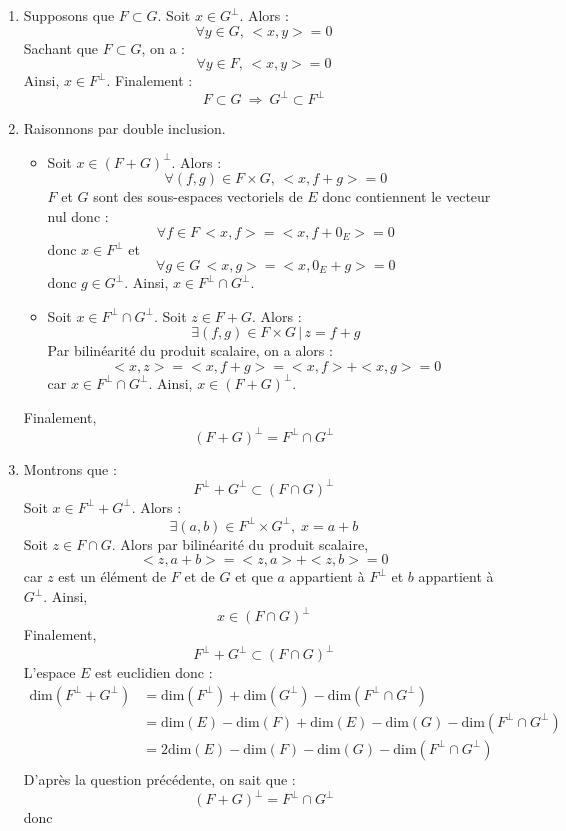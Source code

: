 \documentclass[a4paper,twoside,french,11pt]{VcCours}
\begin{document}
\begin{enumerate}
\item Supposons que $F\subset G$. Soit $x \in G^{\perp}$. Alors :
$$ \forall y \in G, \, <x,y>=0$$
Sachant que $F \subset G$, on a :
$$ \forall y \in F, \, <x,y>=0$$
Ainsi, $x \in F^{\perp}$. Finalement :
$$F\subset G \ \Longrightarrow \ G^{\perp}\subset F^{\perp}$$
\item Raisonnons par double inclusion.
\begin{itemize}
\item Soit $x \in (F+G)^{\perp}$. Alors :
$$ \forall (f,g) \in F \times G, \, <x,f+g>=0$$
$F$ et $G$ sont des sous-espaces vectoriels de $E$ donc contiennent le vecteur nul donc :
$$ \forall f \in F  \, <x,f>=<x,f+0_E>=0$$
donc $x \in F^{\perp}$ et 
$$ \forall g \in G  \, <x,g>=<x,0_E+g>=0$$
donc $g \in G^{\perp}$. Ainsi, $x \in F^{\perp}\cap G^{\perp}$.
\item Soit $x \in F^{\perp}\cap G^{\perp}$. Soit $z \in F+G$. Alors :
$$ \exists (f,g) \in F \times G \, \vert \, z=f+g$$
Par bilinéarité du produit scalaire, on a alors :
$$ <x,z>=<x,f+g> = <x,f>+<x,g> = 0$$
car $x \in F^{\perp}\cap G^{\perp}$. Ainsi, $x \in (F+G)^{\perp}$.
\end{itemize}
Finalement,
$$(F+G)^{\perp}=F^{\perp}\cap G^{\perp}$$
\item Montrons que :
$$ F^{\perp}+G^{\perp} \subset (F\cap G)^{\perp}$$
Soit $x \in F^{\perp}+G^{\perp}$. Alors :
$$ \exists (a,b) \in F^{\perp} \times G^{\perp}, \; x=a+b$$
Soit $z \in F \cap G$. Alors par bilinéarité du produit scalaire,
$$ <z,a+b>=<z,a>+<z,b>=0$$
car $z$ est un élément de $F$ et de $G$ et que $a$ appartient à $F^{\perp}$ et $b$ appartient à $G^{\perp}$. Ainsi,
$$ x \in (F\cap G)^{\perp}$$
Finalement,
$$ F^{\perp}+G^{\perp} \subset (F\cap G)^{\perp}$$
L'espace $E$ est euclidien donc :
\begin{align*}
 \textrm{dim}(F^{\perp}+G^{\perp}) & =  \textrm{dim}(F^{\perp}) +  \textrm{dim}(G^{\perp}) -  \textrm{dim}(F^{\perp} \cap G^{\perp}) \\
 & = \textrm{dim}(E) - \textrm{dim}(F) + \textrm{dim}(E)- \textrm{dim}(G) - \textrm{dim}(F^{\perp} \cap G^{\perp}) \\ 
 & = 2 \textrm{dim}(E) - \textrm{dim}(F) - \textrm{dim}(G) - \textrm{dim}(F^{\perp} \cap G^{\perp})\\
\end{align*}
D'après la question précédente, on sait que :
$$ (F+G)^{\perp}=F^{\perp}\cap G^{\perp}$$ 
donc 
 \begin{align*}

\end{align*}
\end{enumerate}
\end{document}
